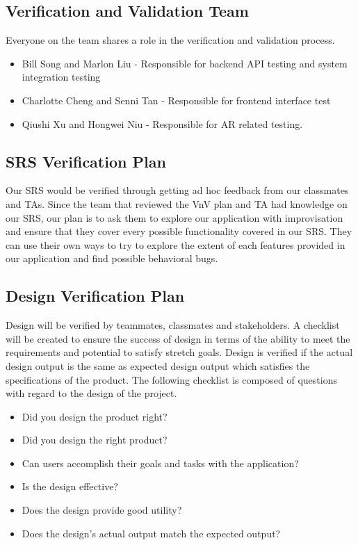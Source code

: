 \documentclass[12pt, titlepage]{article}
\begin{document}
\subsection{Verification and Validation Team}

\noindent
Everyone on the team shares a role in the verification and validation process.
\begin{itemize}
    \item Bill Song and Marlon Liu - Responsible for backend API testing and system integration testing
    \item Charlotte Cheng and Senni Tan - Responsible for frontend interface test
    \item Qiushi Xu and Hongwei Niu - Responsible for AR related testing. 
\end{itemize} 

 

\subsection{SRS Verification Plan}

 
\noindent
Our SRS would be verified through getting ad hoc feedback from our classmates and TAs. Since the team that reviewed the VnV plan and TA had knowledge on our SRS, our plan is to ask them to explore our application with improvisation and ensure that they cover every possible functionality covered in our SRS. They can use their own ways to try to explore the extent of each features provided in our application and find possible behavioral bugs. 

\subsection{Design Verification Plan}

Design will be verified by teammates, classmates and stakeholders. A checklist will be created to ensure the success of design in terms of the ability to meet the requirements and potential to satisfy stretch goals. Design is verified if the actual design output is the same as expected design output which satisfies the specifications of the product. The following checklist is composed of questions with regard to the design of the project.
\begin{itemize}
    \item Did you design the product right?
    \item Did you design the right product?
    \item Can users accomplish their goals and tasks with the application?
    \item Is the design effective?
    \item Does the design provide good utility?
    \item Does the design's actual output match the expected output?
\end{itemize}
\end{document}
